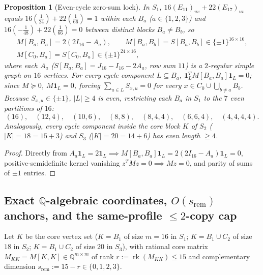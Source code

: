 \documentclass[11pt,reqno]{amsart}
\newtheorem{proposition}[theorem]{Proposition}
\theoremstyle{definition}
\theoremstyle{remark}
\numberwithin{equation}{section}
\numberwithin{table}{section}
\DeclareMathOperator{\rk}{rk}
\begin{document}
\begin{proposition}[Even-cycle zero-sum lock]\label{prop:alg85}
In $S_1$, $16(E_{11})_{uv} + 22(E_{17})_{uv}$ equals $16(\frac{1}{24}) + 22(\frac{1}{66}) = 1$ within each $B_a$ ($a \in \{1,2,3\}$) and $16(-\frac{1}{48}) + 22(\frac{1}{66}) = 0$ between distinct blocks $B_a \neq B_b$, so
\begin{gather*}
  M[B_a, B_a] = 2(2I_{16} - A_a), \qquad M[B_a, B_b] = S[B_a, B_b] \in \{\pm 1\}^{16 \times 16}, \\
  M[C_0, B_a] = S[C_0, B_a] \in \{\pm 1\}^{24 \times 16},
\end{gather*}
where each $A_a$ ($S[B_a, B_a] = J_{16} - I_{16} - 2A_a$, row sum $11$) is a $2$-regular simple graph on $16$ vertices. For every cycle component $L \subseteq B_a$, $\mathbf{1}_L^T M[B_a, B_a] \mathbf{1}_L = 0$; since $M \succeq 0$, $M \mathbf{1}_L = 0$, forcing $\sum_{u \in L} S_{x, u} = 0$ for every $x \in C_0 \cup \bigcup_{b \neq a} B_b$. Because $S_{x, u} \in \{\pm 1\}$, $|L| \ge 4$ is even, restricting each $B_a$ in $S_1$ to the $7$ even partitions of $16$:
\[
  (16), \quad (12, 4), \quad (10, 6), \quad (8, 8), \quad (8, 4, 4), \quad (6, 6, 4), \quad (4, 4, 4, 4).
\]
Analogously, every cycle component inside the core block $K$ of $S_2$ ($|K| = 18 = 15 + 3$) and $S_3$ ($|K| = 20 = 14 + 6$) has even length $\ge 4$.
\end{proposition}

\begin{proof}
Directly from $A_a \mathbf{1}_L = 2\mathbf{1}_L \implies M[B_a, B_a]\mathbf{1}_L = 2(2I_{16} - A_a)\mathbf{1}_L = 0$, positive-semidefinite kernel vanishing $z^T M z = 0 \implies Mz = 0$, and parity of sums of $\pm 1$ entries.
\end{proof}

\subsection{Exact \texorpdfstring{$\mathbb{Q}$-algebraic coordinates, $O(s_{\mathrm{rem}})$ anchors, and the same-profile $\le 2$-copy cap}{Q-algebraic coordinates, O(s_rem) anchors, and the same-profile <= 2-copy cap}}
Let $K$ be the core vertex set ($K = B_1$ of size $m = 16$ in $S_1$; $K = B_1 \cup C_2$ of size $18$ in $S_2$; $K = B_1 \cup C_2$ of size $20$ in $S_3$), with rational core matrix $M_{KK} = M[K, K] \in \mathbb{Q}^{m \times m}$ of rank $r := \rk(M_{KK}) \le 15$ and complementary dimension $s_{\mathrm{rem}} := 15 - r \in \{0, 1, 2, 3\}$.
\end{document}
